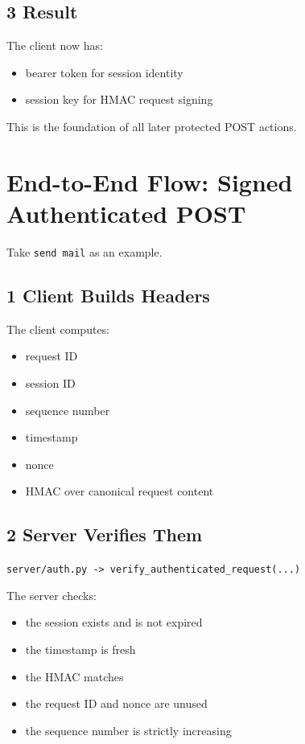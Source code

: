 \documentclass[11pt,a4paper]{article}
\begin{document}
\subsection{3 Result}

The client now has:

\begin{itemize}
\item bearer token for session identity
\item session key for HMAC request signing
\end{itemize}

This is the foundation of all later protected POST actions.


\section{End-to-End Flow: Signed Authenticated POST}

Take \nolinkurl{send mail} as an example.

\subsection{1 Client Builds Headers}

The client computes:

\begin{itemize}
\item request ID
\item session ID
\item sequence number
\item timestamp
\item nonce
\item HMAC over canonical request content
\end{itemize}

\subsection{2 Server Verifies Them}

\nolinkurl{server/auth.py -> verify_authenticated_request(...)}

The server checks:

\begin{itemize}
\item the session exists and is not expired
\item the timestamp is fresh
\item the HMAC matches
\item the request ID and nonce are unused
\item the sequence number is strictly increasing
\end{itemize}
\end{document}
